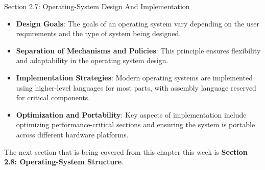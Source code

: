 \begin{notes}{Section 2.7: Operating-System Design And Implementation}
\begin{highlight}[Implementation]
    \end{highlight}
    
    \begin{highlight}
    
    \begin{itemize}
        \item \textbf{Design Goals}: The goals of an operating system vary depending on the user requirements and the type of system being designed.
        \item \textbf{Separation of Mechanisms and Policies}: This principle ensures flexibility and adaptability in the operating system design.
        \item \textbf{Implementation Strategies}: Modern operating systems are implemented using higher-level languages for most parts, with assembly language reserved for critical components.
        \item \textbf{Optimization and Portability}: Key aspects of implementation include optimizing performance-critical sections and ensuring the system is portable across different hardware platforms.
    \end{itemize}
    
    \end{highlight}
\end{notes}

The next section that is being covered from this chapter this week is \textbf{Section 2.8: Operating-System Structure}.


